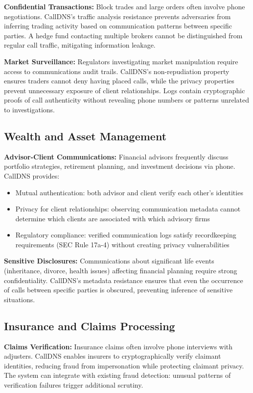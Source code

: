 \documentclass[11pt,twocolumn]{article}
\begin{document}
\textbf{Confidential Transactions:} Block trades and large orders often involve phone negotiations. CallDNS's traffic analysis resistance prevents adversaries from inferring trading activity based on communication patterns between specific parties. A hedge fund contacting multiple brokers cannot be distinguished from regular call traffic, mitigating information leakage.

\textbf{Market Surveillance:} Regulators investigating market manipulation require access to communications audit trails. CallDNS's non-repudiation property ensures traders cannot deny having placed calls, while the privacy properties prevent unnecessary exposure of client relationships. Logs contain cryptographic proofs of call authenticity without revealing phone numbers or patterns unrelated to investigations.

\subsection{Wealth and Asset Management}

\textbf{Advisor-Client Communications:} Financial advisors frequently discuss portfolio strategies, retirement planning, and investment decisions via phone. CallDNS provides:
\begin{itemize}
\item Mutual authentication: both advisor and client verify each other's identities
\item Privacy for client relationships: observing communication metadata cannot determine which clients are associated with which advisory firms
\item Regulatory compliance: verified communication logs satisfy recordkeeping requirements (SEC Rule 17a-4) without creating privacy vulnerabilities
\end{itemize}

\textbf{Sensitive Disclosures:} Communications about significant life events (inheritance, divorce, health issues) affecting financial planning require strong confidentiality. CallDNS's metadata resistance ensures that even the occurrence of calls between specific parties is obscured, preventing inference of sensitive situations.

\subsection{Insurance and Claims Processing}

\textbf{Claims Verification:} Insurance claims often involve phone interviews with adjusters. CallDNS enables insurers to cryptographically verify claimant identities, reducing fraud from impersonation while protecting claimant privacy. The system can integrate with existing fraud detection: unusual patterns of verification failures trigger additional scrutiny.
\end{document}
